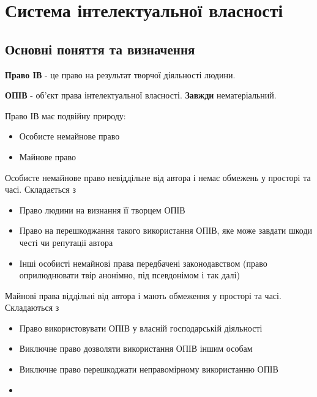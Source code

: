 \section{Система інтелектуальної власності}
\subsection{Основні поняття та визначення}
\textbf{Право ІВ} - це право на результат творчої діяльності людини.

\textbf{ОПІВ} - об’єкт права інтелектуальної власності. \textbf{Завжди} нематеріальний.

Право ІВ має подвійну природу: 
\begin{itemize}
	\item Особисте немайнове право
	\item Майнове право
\end{itemize}

Особисте немайнове право невіддільне від автора і немає обмежень у просторі та часі. Складається з
\begin{itemize}
	\item Право людини на визнання її творцем ОПІВ
	\item Право на перешкоджання такого використання ОПІВ, яке може завдати шкоди честі чи репутації автора
	\item Інші особисті немайнові права передбачені законодавством (право оприлюднювати твір анонімно, під псевдонімом і так далі)
\end{itemize}

Майнові права віддільні від автора і мають обмеження у просторі та часі. Складаються з
\begin{itemize}
	\item Право використовувати ОПІВ у власній господарській діяльності
	\item Виключне право дозволяти використання ОПІВ іншим особам
	\item Виключне право перешкоджати неправомірному використанню ОПІВ
	\item 
\end{itemize}
